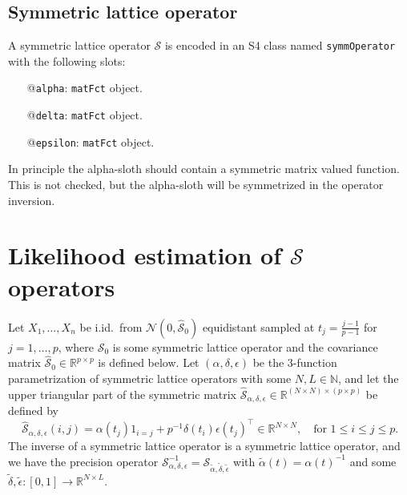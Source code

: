 \documentclass[12pt,a4paper]{article}
\newcommand{\Rset}{\mathbb{R}}
\newcommand{\Nset}{\mathbb{N}}
\newcommand{\Sop}{\mathcal{S}}
\begin{document}
\subsection{Symmetric lattice operator}

A symmetric lattice operator $\Sop$ is encoded in an S4 class named \texttt{symmOperator} with the following slots: 
\begin{itemize}
\item[@\texttt{alpha}:] \texttt{matFct} object.
\item[@\texttt{delta}:] \texttt{matFct} object.
\item[@\texttt{epsilon}:] \texttt{matFct} object.
\end{itemize}
In principle the alpha-sloth should contain a symmetric matrix valued function. This is not checked, but the alpha-sloth will be symmetrized in the operator inversion.


\section{Likelihood estimation of $\Sop$ operators}

Let $X_1,\dotsc,X_n$ be i.id.\ from $\mathcal{N}(0,\hat{\Sop}_0)$ equidistant sampled at $t_j = \frac{j-1}{p-1}$ for $j=1,\dotsc,p$, where $\Sop_0$ is some symmetric lattice operator and the covariance matrix $\hat{\Sop}_0 \in \Rset^{p \times p}$ is defined below. Let $(\alpha,\delta,\epsilon)$ be the 3-function parametrization of symmetric lattice operators with some $N, L \in \Nset$, and let the upper triangular part of the symmetric matrix $\hat{\Sop}_{\alpha,\delta,\epsilon} \in \Rset^{(N \times N) \times (p \times p)}$ be defined by
\begin{equation*}
\hat{\Sop}_{\alpha,\delta,\epsilon}(i,j) = \alpha(t_j) 1_{i=j} + p^{-1} \delta(t_i) \epsilon(t_j)^\top \in \Rset^{N \times N}, \quad \text{for $1 \le i \le j \le p$.}
\end{equation*}
The inverse of a symmetric lattice operator is a symmetric lattice operator, and we have the precision operator $\Sop_{\alpha,\delta,\epsilon}^{-1} = \Sop_{\tilde{\alpha},\tilde{\delta},\tilde{\epsilon}}$ with $\tilde{\alpha}(t) = \alpha(t)^{-1}$ and some $\tilde{\delta}, \tilde{\epsilon}\colon [0,1] \to \Rset^{N \times L}$. 
\end{document}
